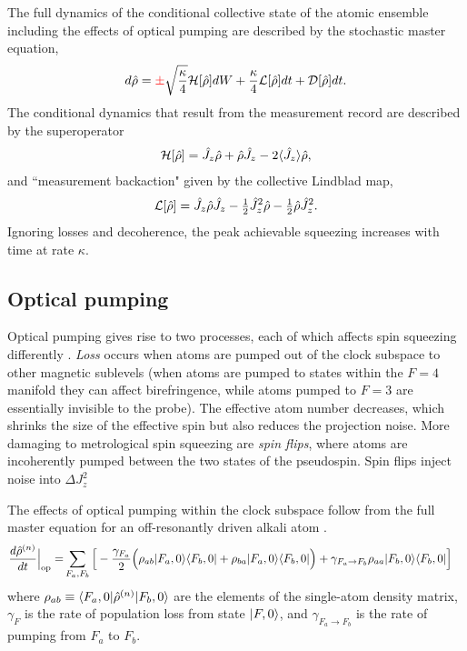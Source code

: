 \documentclass[preprint,aps,pra,onecolumn]{revtex4-1} %
\newcommand{\comment}[1]{{\color{Maroon} #1}}
\newcommand{\error}[1]{{\color{red} #1}}
\begin{document}
The full dynamics of the conditional collective state of the atomic ensemble including the effects of optical pumping are described by the stochastic master equation,
	\begin{align}
		d \hat{\rho} = \error{\pm}\sqrt{\frac{\kappa}{4}} \mathcal{H}[\hat{\rho}] dW + \frac{\kappa}{4} \mathcal{L}[\hat{\rho}] dt + \mathcal{D} [\hat{\rho}] dt.
	\end{align}
The conditional dynamics that result from the measurement record are described by the superoperator
	\begin{align}
		\mathcal{H}[\hat{\rho}] = \hat{J}_z \hat{\rho} + \hat{\rho} \hat{J}_z - 2 \langle{\hat{J}_z}\rangle \hat{\rho},
	\end{align}
and ``measurement backaction" given by the collective Lindblad map, 
	\begin{align}
		\mathcal{L}[\hat{\rho}] = \hat{J}_z \hat{\rho} \hat{J}_z - \mbox{$\frac{1}{2}$} \hat{J}_z^2 \hat{\rho} - \mbox{$\frac{1}{2}$} \hat{\rho}  \hat{J}_z^2 .
	\end{align}
Ignoring losses and decoherence, the peak achievable squeezing increases with time at rate $\kappa$.  	
	
	\subsection{Optical pumping}
	
Optical pumping gives rise to two processes, each of which affects spin squeezing differently \cite{norris_enhanced_2012}. \emph{Loss} occurs when atoms are pumped out of the clock subspace to other magnetic sublevels \comment{(when atoms are pumped to states within the $F=4$ manifold they can affect birefringence, while atoms pumped to $F=3$ are essentially invisible to the probe)}. The effective atom number decreases, which shrinks the size of the effective spin but also reduces the projection noise.  More damaging to metrological spin squeezing are \emph{spin flips}, where atoms are incoherently pumped between the two states of the pseudospin. Spin flips inject noise into $\Delta J_z^2$

The effects of optical pumping within the clock subspace follow from the full master equation for an off-resonantly driven alkali atom \cite{deutsch_quantum_2010}.  
	\begin{align}
		\frac{d \hat{\rho}^{(n)}  }{dt}\Big|_{\rm op} 
		= & \sum_{F_a,F_b} \Big[ -\frac{\gamma_{F_a}}{2} \Big( \rho_{ab } \lvert{F_a,0}\rangle\langle{F_b,0}\rvert + \rho_{ba} \lvert{F_a,0}\rangle\langle{F_b,0}\rvert \Big) +  \gamma_{F_a \rightarrow F_b} \rho_{aa} \lvert{F_b,0}\rangle\langle{F_b,0}\rvert \Big]
	\end{align}
where $\rho_{ab} \equiv \langle{F_a,0}\rvert \hat{\rho}^{(n)} \lvert{F_b,0}\rangle $ are the elements of the single-atom density matrix, $\gamma_F$ is the rate of population loss from state $\lvert{F,0}\rangle$, and $\gamma_{F_a \rightarrow F_b}$ is the rate of pumping from $F_a$ to $F_b$.  
\end{document}
